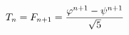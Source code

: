 \documentclass[preview]{standalone}
\begin{document}
\begin{align*}
\special{dvisvgm:raw <g id='unique000'>}T_n = F_{n+1} = \frac{\varphi^{n+1} - \psi^{n+1}}{\sqrt{5}}\special{dvisvgm:raw </g>}
\end{align*}
\end{document}
